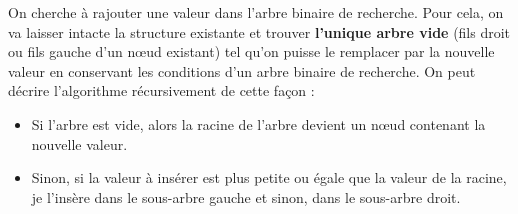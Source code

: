 \documentclass{../cours}
\begin{document}
On cherche à rajouter une valeur dans l'arbre binaire de recherche. Pour cela, on va laisser intacte la structure existante et trouver \textbf{l'unique arbre vide} (fils droit ou fils gauche d'un nœud existant) tel qu'on puisse le remplacer par la nouvelle valeur en conservant les conditions d'un arbre binaire de recherche. On peut décrire l'algorithme récursivement de cette façon :
\begin{itemize}
\item Si l'arbre est vide, alors la racine de l'arbre devient un nœud contenant la nouvelle valeur.
\item Sinon, si la valeur à insérer est plus petite ou égale que la valeur de la racine, je l'insère dans le sous-arbre gauche et sinon, dans le sous-arbre droit.
\end{itemize}
\end{document}
